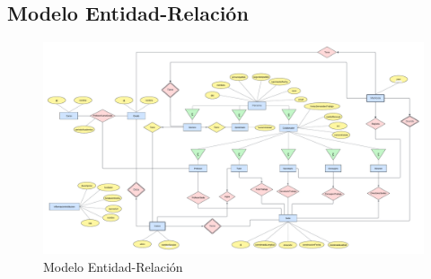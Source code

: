 \subsection{Modelo Entidad-Relación}

\begin{figure}[htp]
	\centering
	\includegraphics[width=\textwidth]{figures/modeloer.png}
	\caption{Modelo Entidad-Relación}
	\label{fig:my_label}
\end{figure}

